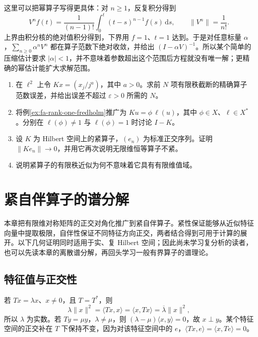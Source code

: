 \documentclass[UTF8,12pt,a4paper,fontset=fandol]{ctexbook}
\begin{document}
这里可以把幂算子写得更具体：对 $n\geq1$，反复积分得到
\[
 V^nf(t)=\frac1{(n-1)!}\int_0^t(t-s)^{n-1}f(s)\,\mathrm ds,
 \qquad \|V^n\|=\frac1{n!}.
\]
上界由积分核的绝对值积分得到，下界用 $f=1$、$t=1$ 达到。于是对任意标量 $\alpha$，$\sum_{n\geq0}\alpha^nV^n$ 都在算子范数下绝对收敛，并给出 $(I-\alpha V)^{-1}$。所以某个简单的压缩估计要求 $|\alpha|<1$，并不意味着参数超出这个范围后方程就没有唯一解；更精确的幂估计能扩大求解范围。
\begin{enumerate}
 \item 在 $\ell^2$ 上令 $Kx=(x_j/j^a)$，其中 $a>0$。求前 $N$ 项有限秩截断的精确算子范数误差，并给出误差不超过 $\varepsilon>0$ 所需的 $N$。
 \item 将例\ref{ex:fa-rank-one-fredholm}推广为 $Ku=\phi\,\ell(u)$，其中 $\phi\in X$、$\ell\in X^*$。分别在 $\ell(\phi)\ne1$ 与 $\ell(\phi)=1$ 时讨论 $I-K$。
 \item 设 $K$ 为 Hilbert 空间上的紧算子，$(e_n)$ 为标准正交序列。证明 $\|Ke_n\|\to0$，并用它再次说明无限维恒等算子不紧。
 \item 说明紧算子的有限秩近似为何不意味着它具有有限维值域。
\end{enumerate}

\chapter{紧自伴算子的谱分解}
\label{chap:fa-compact-spectral}

本章把有限维对称矩阵的正交对角化推广到紧自伴算子。紧性保证能够从近似特征向量中提取极限，自伴性保证不同特征方向正交，两者结合得到可用于计算的展开。以下几何证明同时适用于实、复 Hilbert 空间；因此尚未学习复分析的读者，也可以先读本章的离散谱分解，再回头学习一般有界算子的谱理论。

\section{特征值与正交性}
若 $Tx=\lambda x$、$x\ne0$，且 $T=T^*$，则
\[
 \lambda\|x\|^2=\langle Tx,x\rangle
 =\langle x,Tx\rangle=\overline\lambda\|x\|^2,
\]
所以 $\lambda$ 为实数。若 $Ty=\mu y$，$\lambda\ne\mu$，则 $(\lambda-\mu)\langle x,y\rangle=0$，故 $x\perp y$。某个特征空间的正交补在 $T$ 下保持不变，因为对该特征空间中的 $e$，$\langle Tx,e\rangle=\langle x,Te\rangle=0$。
\end{document}
